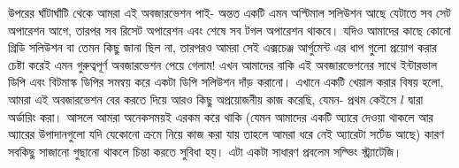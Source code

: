 \begin{solution}
উপরের ঘাঁটাঘাঁটি থেকে আমরা এই অবজারভেশন পাই- অন্তত একটি এমন অপ্টিমাল সলিউশন আছে যেটাতে সব সেট অপারেশন আগে, তারপর সব রিসেট অপারেশন এবং শেষে সব টগল অপারেশন থাকবে। যদিও আমাদের কাছে কোনো গ্রিডি সলিউশন বা তেমন কিছু জানা ছিল না, তারপরও আমরা সেই এক্সচেঞ্জ আর্গুমেন্ট এর ধাপ গুলো প্রয়োগ করার চেষ্টা করেই এমন গুরুত্বপূর্ণ অবজারভেশন পেয়ে গেলাম! এখন আমাদের বাকি এই অবজারভেশনের সাথে ইন্টারভাল ডিপি এবং বিটমাস্ক ডিপির সমন্বয় করে একটা ডিপি সলিউশন দাঁড় করানো। এখানে একটি খেয়াল করার বিষয় হলো, আমরা এই অবজারভেশন বের করতে দিয়ে আরও কিছু অপ্রয়োজনীয় কাজ করেছি, যেমন- প্রথম কেইসে $l$ দ্বারা অর্ডারিং করা। আসলে আমরা অনেকসময়ই এরকম করে থাকি (যেমন আমাদের একটি অ্যারে দেওয়া থাকলে আর অ্যারের উপাদানগুলো যদি যেকোনো ক্রমে নিয়ে কাজ করা যায় তাহলে আমরা ধরে নেই অ্যারেটা সর্টেড আছে) কারণ সবকিছু সাজানো গুছানো থাকলে চিন্তা করতে সুবিধা হয়। এটা একটা সাধারণ প্রবলেম সল্ভিং স্ট্র্যাটেজি।


\end{solution}
